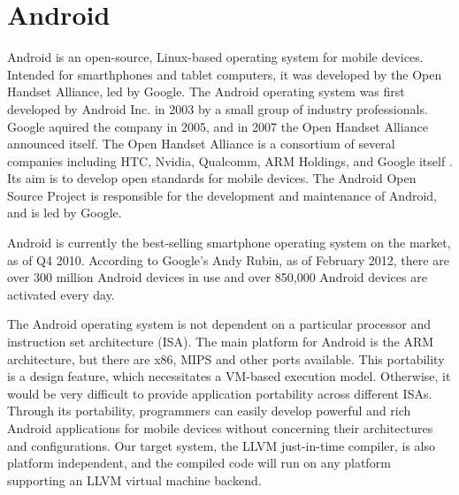 \section{Android}
\label{sec:android}

Android is an open-source, Linux-based operating system for mobile devices. Intended for smarthphones and tablet computers, it was developed by the Open Handset Alliance, led by Google. The Android operating system was first developed by Android Inc. in 2003 by a small group of industry professionals. Google aquired the company in 2005, and in 2007 the Open Handset Alliance announced itself. The Open Handset Alliance is a consortium of several companies including HTC, Nvidia, Qualcomm, ARM Holdings, and Google itself \cite{oha_members}. Its aim is to develop open standards for mobile devices. The Android Open Source Project is responsible for the development and maintenance of Android, and is led by Google.

Android is currently the best-selling smartphone operating system on the market, as of Q4 2010\cite{android_top}. According to Google's Andy Rubin, as of February 2012, there are over 300 million Android devices in use and over 850,000 Android devices are activated every day\footnotemark {}.

The Android operating system is not dependent on a particular processor and instruction set architecture (ISA). The main platform for Android is the ARM architecture, but there are x86, MIPS and other ports available. This portability is a design feature, which necessitates a VM-based execution model. Otherwise, it would be very difficult to provide application portability across different ISAs. Through its portability, programmers can easily develop powerful and rich Android applications for mobile devices without concerning their architectures and conﬁgurations. Our target system, the LLVM just-in-time compiler, is also platform independent, and the compiled code will run on any platform supporting an LLVM virtual machine backend.
